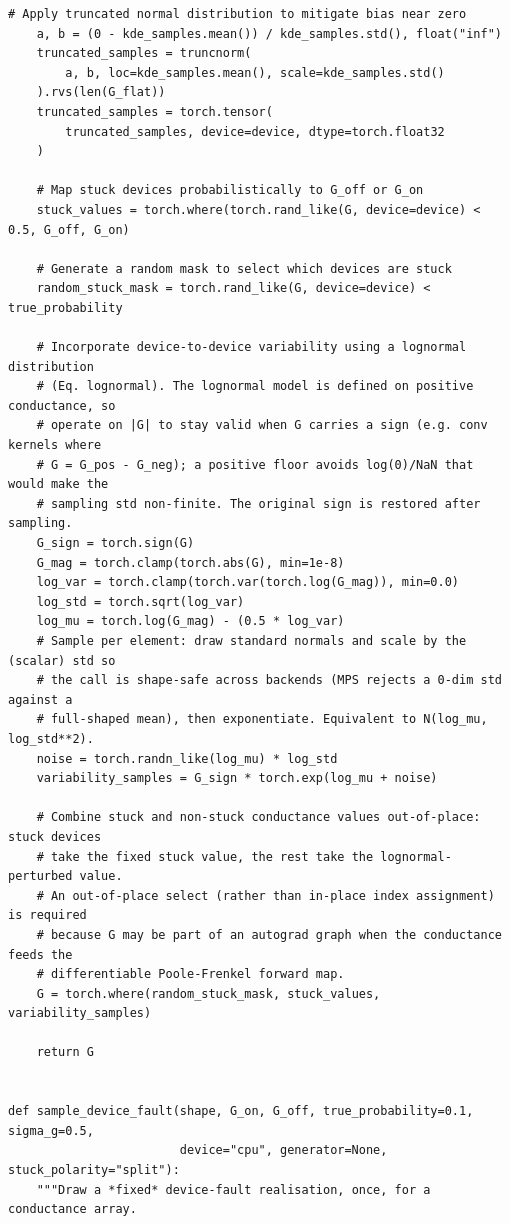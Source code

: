 \begin{lstlisting}[caption={mnn\_torch/effects.py},label={lst:mnn-src-effects}]
    # Apply truncated normal distribution to mitigate bias near zero
    a, b = (0 - kde_samples.mean()) / kde_samples.std(), float("inf")
    truncated_samples = truncnorm(
        a, b, loc=kde_samples.mean(), scale=kde_samples.std()
    ).rvs(len(G_flat))
    truncated_samples = torch.tensor(
        truncated_samples, device=device, dtype=torch.float32
    )

    # Map stuck devices probabilistically to G_off or G_on
    stuck_values = torch.where(torch.rand_like(G, device=device) < 0.5, G_off, G_on)

    # Generate a random mask to select which devices are stuck
    random_stuck_mask = torch.rand_like(G, device=device) < true_probability

    # Incorporate device-to-device variability using a lognormal distribution
    # (Eq. lognormal). The lognormal model is defined on positive conductance, so
    # operate on |G| to stay valid when G carries a sign (e.g. conv kernels where
    # G = G_pos - G_neg); a positive floor avoids log(0)/NaN that would make the
    # sampling std non-finite. The original sign is restored after sampling.
    G_sign = torch.sign(G)
    G_mag = torch.clamp(torch.abs(G), min=1e-8)
    log_var = torch.clamp(torch.var(torch.log(G_mag)), min=0.0)
    log_std = torch.sqrt(log_var)
    log_mu = torch.log(G_mag) - (0.5 * log_var)
    # Sample per element: draw standard normals and scale by the (scalar) std so
    # the call is shape-safe across backends (MPS rejects a 0-dim std against a
    # full-shaped mean), then exponentiate. Equivalent to N(log_mu, log_std**2).
    noise = torch.randn_like(log_mu) * log_std
    variability_samples = G_sign * torch.exp(log_mu + noise)

    # Combine stuck and non-stuck conductance values out-of-place: stuck devices
    # take the fixed stuck value, the rest take the lognormal-perturbed value.
    # An out-of-place select (rather than in-place index assignment) is required
    # because G may be part of an autograd graph when the conductance feeds the
    # differentiable Poole-Frenkel forward map.
    G = torch.where(random_stuck_mask, stuck_values, variability_samples)

    return G


def sample_device_fault(shape, G_on, G_off, true_probability=0.1, sigma_g=0.5,
                        device="cpu", generator=None, stuck_polarity="split"):
    """Draw a *fixed* device-fault realisation, once, for a conductance array.


\end{lstlisting}
